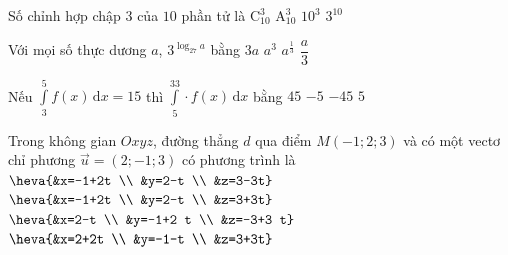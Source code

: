 \begin{ex}%
	Số chỉnh hợp chập $3$ của $10$ phần tử là
	\choice
	{$\mathrm{C}_{10}^3$}
	{\True $\mathrm{A}_{10}^3$}
	{$10^3$}
	{$3^{10}$}
\end{ex}

\begin{ex}%
	Với mọi số thực dương $a$, $3^{\log _{27}a}$ bằng
	\choice
	{$3a$}
	{\True $a^3$}
	{$a^{\tfrac{1}{3}}$}
	{$\dfrac{a}{3}$}
\end{ex}

\begin{ex}%
	Nếu $\displaystyle\int\limits_3^5f(x) \mathrm{\,d} x=15$ thì $\displaystyle\int\limits_5^33 \cdot f(x) \mathrm{\,d} x$ bằng
	\choice
	{$45$}
	{$-5$}
	{\True $-45$}
	{$5$}
\end{ex}

\begin{ex}%
	Trong không gian $Oxyz$, đường thẳng $d$ qua điểm $M(-1;2;3)$ và có một vectơ chỉ phương $\overrightarrow{u}=(2;-1;3)$ có phương trình là
	\choice
	{$\heva{&x=-1+2t \\ &y=2-t \\ &z=3-3t}$}
	{\True $\heva{&x=-1+2t \\ &y=2-t \\ &z=3+3t}$}
	{$\heva{&x=2-t \\ &y=-1+2 t \\ &z=-3+3 t}$}
	{$\heva{&x=2+2t \\ &y=-1-t \\ &z=3+3t}$}
\end{ex}

